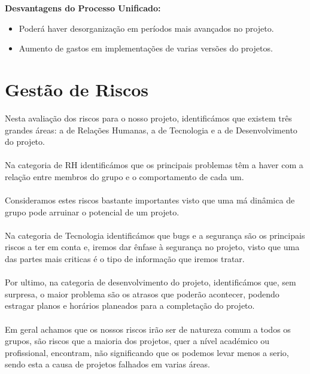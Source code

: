 \documentclass[12pt, a4paper, twoside]{report} %
\begin{document}
\textbf{Desvantagens do Processo Unificado:}
\begin{itemize}
\item Poderá haver desorganização em períodos mais avançados no projeto.
\item Aumento de gastos em implementações de varias versões do projetos.
\end{itemize}


\clearpage


\section{Gestão de Riscos}

Nesta avaliação dos riscos para o nosso projeto, identificámos que existem três grandes áreas: a de Relações Humanas, a de Tecnologia e a de Desenvolvimento do projeto.\\\\ Na categoria de RH identificámos que os principais problemas têm a haver com a relação entre membros do grupo e o comportamento de cada um. \\\\Consideramos estes riscos bastante importantes visto que uma má dinâmica de grupo pode arruinar o potencial de um projeto.\\\\ Na categoria de Tecnologia identificámos que bugs e a segurança são os principais riscos a ter em conta e, iremos dar ênfase à segurança no projeto, visto que uma das partes mais criticas é o tipo de informação que iremos tratar.\\\\ Por ultimo, na categoria de desenvolvimento do projeto, identificámos que, sem surpresa, o maior problema são os atrasos que poderão acontecer, podendo estragar planos e horários planeados para a completação do projeto.\\\\ Em geral achamos que os nossos riscos irão ser de natureza comum a todos os grupos, são riscos que a maioria dos projetos, quer a nível académico ou profissional, encontram, não significando que os podemos levar menos a serio, sendo esta a causa de projetos falhados em varias áreas.
\end{document}

